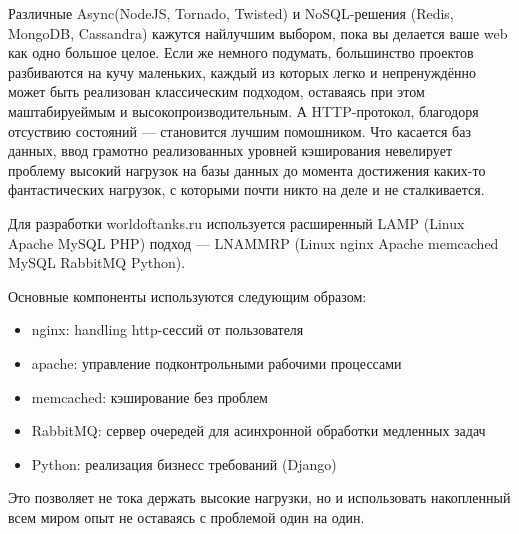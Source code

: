 \documentclass[10pt, a5paper]{article}
\begin{document}
Различные Async(NodeJS, Tornado, Twisted) и NoSQL-решения (Redis, MongoDB, Cassandra) кажутся найлучшим выбором, пока вы делается ваше web как одно большое целое.  Если же немного подумать, большинство проектов разбиваются на кучу маленьких, каждый из которых легко и непренуждённо может быть реализован классическим подходом, оставаясь при этом маштабируеймым и высокопроизводительным. А HTTP-протокол, благодоря отсуствию состояний --- становится лучшим помошником. Что касается баз данных, ввод грамотно реализованных уровней кэширования невелирует проблему высокий нагрузок на базы данных до момента достижения каких-то фантастических нагрузок, с которыми почти никто на деле и не сталкивается.

Для разработки worldoftanks.ru используется расширенный \linebreak LAMP (Linux Apache MySQL PHP) подход --- LNAMMRP (Linux nginx Apache memcached MySQL RabbitMQ Python).

Основные компоненты используются следующим образом:
\begin{itemize}
  \item nginx: handling http-сессий от пользователя
\item apache: управление подконтрольными рабочими процессами
\item memcached: кэширование без проблем
\item RabbitMQ: сервер очередей для асинхронной обработки медленных задач
\item Python: реализация бизнесс требований (Django)
\end{itemize}

Это позволяет не тока держать высокие нагрузки, но и использовать накопленный всем миром опыт не оставаясь с проблемой один на один.
\end{document}
